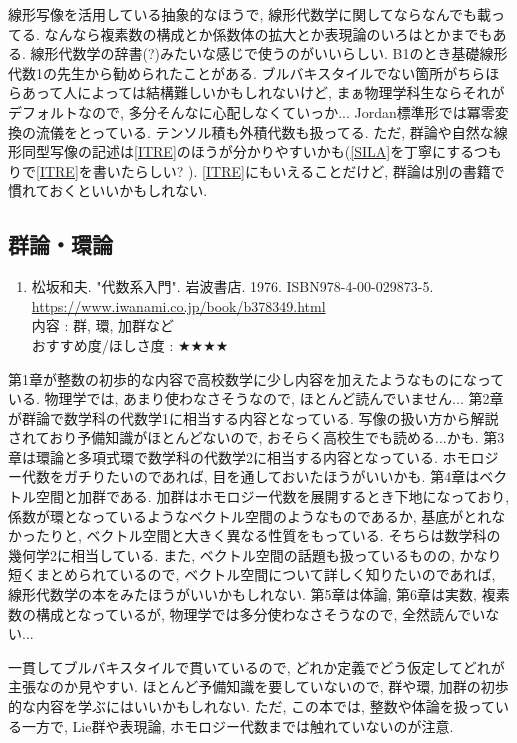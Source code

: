 \documentclass[10pt,a4paper]{jsarticle}
\begin{document}
    線形写像を活用している抽象的なほうで, 線形代数学に関してならなんでも載ってる. なんなら複素数の構成とか係数体の拡大とか表現論のいろはとかまでもある. 線形代数学の辞書(?)みたいな感じで使うのがいいらしい. B1のとき基礎線形代数1の先生から勧められたことがある. ブルバキスタイルでない箇所がちらほらあって人によっては結構難しいかもしれないけど, まぁ物理学科生ならそれがデフォルトなので, 多分そんなに心配しなくていっか... Jordan標準形では冪零変換の流儀をとっている. テンソル積も外積代数も扱ってる. ただ, 群論や自然な線形同型写像の記述は\ref{ITRE}のほうが分かりやすいかも(\ref{SILA}を丁寧にするつもりで\ref{ITRE}を書いたらしい? ). \ref{ITRE}にもいえることだけど, 群論は別の書籍で慣れておくといいかもしれない. 
\subsection{群論・環論}
    \begin{enumerate}
        \renewcommand{\theenumi}{[AL\arabic{enumi}]}
        \renewcommand{\labelenumi}{\theenumi}
        \setcounter{enumi}{0}
        \item \label{MKAL} 松坂和夫. "代数系入門". 岩波書店. 1976. ISBN978-4-00-029873-5. \\
        \url{https://www.iwanami.co.jp/book/b378349.html} \\
        内容 : 群, 環, 加群など\\
        おすすめ度/ほしさ度 : $\bigstar \bigstar \bigstar \bigstar $ 
    \end{enumerate}\par
    第1章が整数の初歩的な内容で高校数学に少し内容を加えたようなものになっている. 物理学では, あまり使わなさそうなので, ほとんど読んでいません... 第2章が群論で数学科の代数学1に相当する内容となっている. 写像の扱い方から解説されており予備知識がほとんどないので, おそらく高校生でも読める...かも. 第3章は環論と多項式環で数学科の代数学2に相当する内容となっている. ホモロジー代数をガチりたいのであれば, 目を通しておいたほうがいいかも. 第4章はベクトル空間と加群である. 加群はホモロジー代数を展開するとき下地になっており, 係数が環となっているようなベクトル空間のようなものであるか, 基底がとれなかったりと, ベクトル空間と大きく異なる性質をもっている. そちらは数学科の幾何学2に相当している. また, ベクトル空間の話題も扱っているものの, かなり短くまとめられているので, ベクトル空間について詳しく知りたいのであれば, 線形代数学の本をみたほうがいいかもしれない. 第5章は体論, 第6章は実数, 複素数の構成となっているが, 物理学では多分使わなさそうなので, 全然読んでいない... \par
    一貫してブルバキスタイルで貫いているので, どれか定義でどう仮定してどれが主張なのか見やすい. ほとんど予備知識を要していないので, 群や環, 加群の初歩的な内容を学ぶにはいいかもしれない. ただ, この本では, 整数や体論を扱っている一方で, Lie群や表現論, ホモロジー代数までは触れていないのが注意. 
\end{document}
